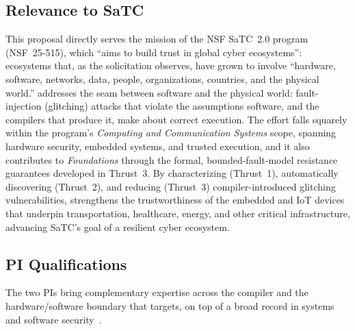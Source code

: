 \subsection{Relevance to SaTC}

This proposal directly serves the mission of the NSF SaTC~2.0 program (NSF~25-515), which ``aims to build trust in global cyber ecosystems'': ecosystems that, as the solicitation observes, have grown to involve ``hardware, software, networks, data, people, organizations, countries, and the physical world.''
\sysname addresses the seam between software and the physical world: fault-injection (glitching) attacks that violate the assumptions software, and the compilers that produce it, make about correct execution.
The effort falls squarely within the program's \emph{Computing and Communication Systems} scope, spanning hardware security, embedded systems, and trusted execution, and it also contributes to \emph{Foundations} through the formal, bounded-fault-model resistance guarantees developed in Thrust~3.
By characterizing (Thrust~1), automatically discovering (Thrust~2), and reducing (Thrust~3) compiler-introduced glitching vulnerabilities, \sysname strengthens the trustworthiness of the embedded and IoT devices that underpin transportation, healthcare, energy, and other critical infrastructure, advancing SaTC's goal of a resilient cyber ecosystem.

\subsection{PI Qualifications}

The two PIs bring complementary expertise across the compiler and the hardware/software boundary that \sysname targets, on top of a broad record in systems and software security~\cite{zhang2019icore, zhao2011automatic, zhao2013using, tang2017nivanalyzer, jing2014morpheus, jing2014riskmon, jing2015towards, li2022understanding}.

